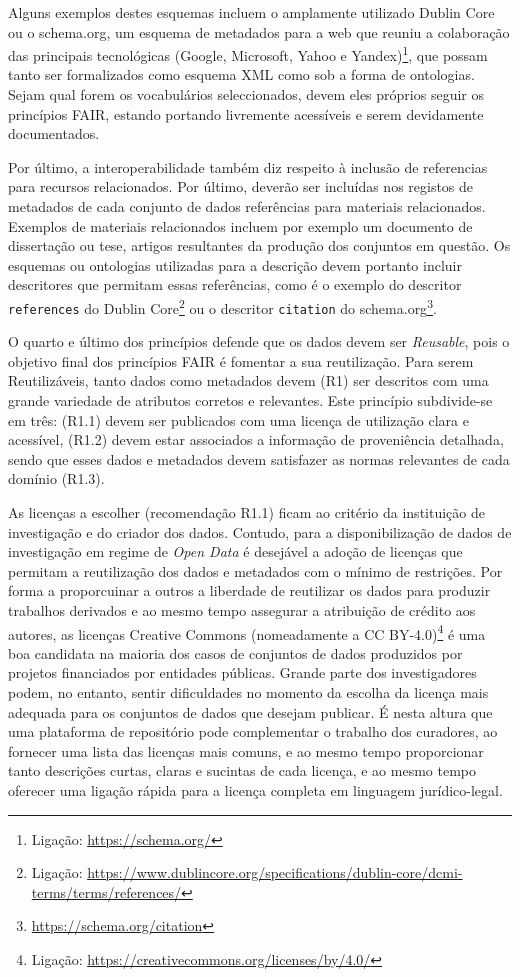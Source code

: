\documentclass[sigconf,nonacm]{acmart}
\begin{document}
Alguns exemplos destes esquemas incluem o amplamente utilizado Dublin Core ou o schema.org, um esquema de metadados para a web que reuniu a colaboração das principais tecnológicas (Google, Microsoft, Yahoo e Yandex)\footnote{Ligação: \url{https://schema.org/}}, que possam tanto ser formalizados como esquema XML como sob a forma de ontologias. Sejam qual forem os vocabulários seleccionados, devem eles próprios seguir os princípios FAIR, estando portando livremente acessíveis e serem devidamente documentados. 

Por último, a interoperabilidade também diz respeito à inclusão de referencias para recursos relacionados. Por último, deverão ser incluídas nos registos de metadados de cada conjunto de dados referências para materiais relacionados. Exemplos de materiais relacionados incluem por exemplo um documento de dissertação ou tese, artigos resultantes da produção dos conjuntos em questão. Os esquemas ou ontologias utilizadas para a descrição devem portanto incluir descritores que permitam essas referências, como é o exemplo do descritor \texttt{references} do Dublin Core\footnote{Ligação: \url{https://www.dublincore.org/specifications/dublin-core/dcmi-terms/terms/references/}} ou o descritor \texttt{citation} do schema.org\footnote{\url{https://schema.org/citation}}.

O quarto e último dos princípios defende que os dados devem ser \textit{Reusable}, pois o objetivo final dos princípios FAIR é fomentar a sua reutilização. Para serem Reutilizáveis, tanto dados como metadados devem (R1) ser descritos com uma grande variedade de atributos corretos e relevantes. Este princípio subdivide-se em três: (R1.1) devem ser publicados com uma licença de utilização clara e acessível, (R1.2) devem estar associados a informação de proveniência detalhada, sendo que esses dados e metadados devem satisfazer as normas relevantes de cada domínio (R1.3).

As licenças a escolher (recomendação R1.1) ficam ao critério da instituição de investigação e do criador dos dados. Contudo, para a disponibilização de dados de investigação em regime de \emph{Open Data} é desejável a adoção de licenças que permitam a reutilização dos dados e metadados com o mínimo de restrições. Por forma a proporcuinar a outros a liberdade de reutilizar os dados para produzir trabalhos derivados e ao mesmo tempo assegurar a atribuição de crédito aos autores, as licenças Creative Commons (nomeadamente a CC BY-4.0)\footnote{Ligação: \url{https://creativecommons.org/licenses/by/4.0/}} é uma boa candidata na maioria dos casos de conjuntos de dados produzidos por projetos financiados por entidades públicas. Grande parte dos investigadores podem, no entanto, sentir dificuldades no momento da escolha da licença mais adequada para os conjuntos de dados que desejam publicar. É nesta altura que uma plataforma de repositório pode complementar o trabalho dos curadores, ao fornecer uma lista das licenças mais comuns, e ao mesmo tempo proporcionar tanto descrições curtas, claras e sucintas de cada licença, e ao mesmo tempo oferecer uma ligação rápida para a licença completa em linguagem jurídico-legal. 
\end{document}
